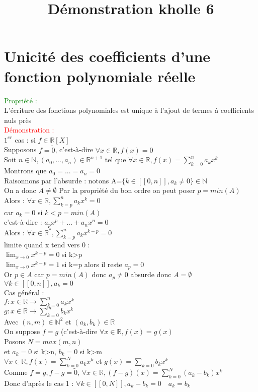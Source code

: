\documentclass{article}
\begin{document}
\title{Démonstration kholle 6}
\date{}
\maketitle
	\renewcommand{\thesection}{\Roman{section}}
	\setlength{\parindent}{1.5cm}
	\section{Unicité des coefficients d'une fonction polynomiale réelle}
	\textcolor{green}{Propriété :} \\
	L'écriture des fonctions polynomiales est unique à l'ajout de termes à coefficients nuls près \\
	\textcolor{red}{Démonstration :} \\
	$1^{er}$ cas : si $f \in \mathbb{R}[X]$ \\
	Supposons $f =\tilde{0}$, c'est-à-dire $\forall x \in \mathbb{R}, f(x)=0$  \\
	Soit $n \in \mathbb{N}, (a_0,...,a_n) \in \mathbb{R}^{n+1}$ tel que $\forall x \in \mathbb{R}, f(x)= \sum_{k=0}^{n} a_kx^k$ \\
	Montrons que $a_0=...=a_n=0$ \\
	Raisonnons par l'absurde :
		notons A=$\lbrace k \in [[0,n]],a_k \neq 0 \rbrace \in \mathbb{N}$ \\
		On a donc $A \neq \emptyset$ Par la propriété du bon ordre on peut poser $p=min(A)$ \\
		Alors : $\forall x \in \mathbb{R}, \sum_{k=p}^{n}a_k x^k =0$ \\
		car $a_k=0$ si $k<p=min(A)$ \\
		c'est-à-dire : $a_p x^p+...+a_nx^n=0$ \\
		Alors : $\forall x \in \mathbb{R}^*, \sum_{k=p}^n a_k x^{k-p}=0$ \\
		limite quand x tend vers 0 : \\
		$\lim_{x \rightarrow 0} x^{k-p}=0$ si k>p \\
		$\lim_{x \rightarrow 0} x^{k-p}=1$ si k=p alors il reste $a_p=0$ \\
		Or $p \in A$ car $p=min(A)$ donc $a_p \neq 0$ absurde donc $A = \emptyset$ $\forall k \in [[0,n]], a_k=0$ \\
		Cas général : \\
		$f :x \in \mathbb{R} \rightarrow \sum_{k=0}^n a_k x^k$ \\
		$ g: x \in \mathbb{R} \rightarrow \sum_{k=0}^m b_k x^k$ \\
		Avec $(n,m) \in \mathbb{N}^2$ et $(a_k,b_k) \in \mathbb{R}$ \\
		On suppose $f=g$ (c'est-à-dire $\forall x \in \mathbb{R}, f(x)=g(x)$ \\
		Posons $N=max(m,n)$ \\
		et $a_k=0$ si k>n, $b_k=0$ si k>m \\
		$\forall x \in \mathbb{R}, f(x)=\sum_{k=0}^N a_k x^k$ et $g(x)= \sum_{k=0} b_k x^k $ \\
		Comme $f=g, f-g=\tilde{0}$, $ \forall x \in \mathbb{R}, (f-g)(x)=\sum_{k=0}^N(a_k-b_k)x^k$ \\
		Donc d'après le cas 1 : $\forall k \in [[0,N]], a_k-b_k=0 \quad a_k=b_k$
\end{document}
